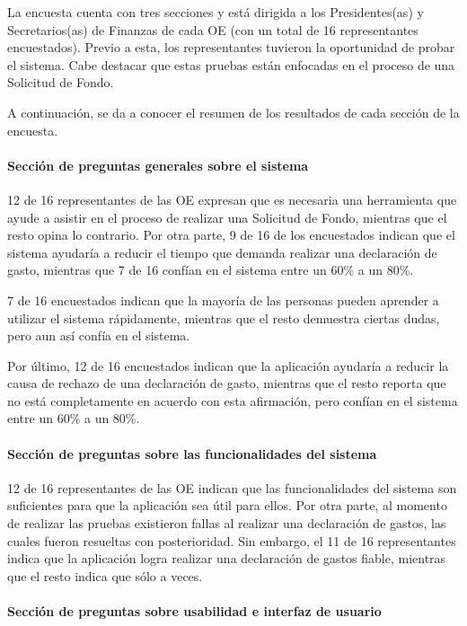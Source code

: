 La encuesta cuenta con tres secciones y está dirigida a los Presidentes(as) y Secretarios(as) de Finanzas de cada OE (con un total de 16 representantes encuestados). Previo a esta, los representantes tuvieron la oportunidad de probar el sistema. Cabe destacar que estas pruebas están enfocadas en el proceso de una Solicitud de Fondo.

A continuación, se da a conocer el resumen de los resultados de cada sección de la encuesta.

\paragraph{Sección de preguntas generales sobre el sistema}

12 de 16 representantes de las OE expresan que es necesaria una herramienta que ayude a asistir en el proceso de realizar una Solicitud de Fondo, mientras que el resto opina lo contrario. Por otra parte, 9 de 16 de los encuestados indican que el sistema ayudaría a reducir el tiempo que demanda realizar una declaración de gasto, mientras que 7 de 16 confían en el sistema entre un 60\% a un 80\%.

7 de 16 encuestados indican que la mayoría de las personas pueden aprender a utilizar el sistema rápidamente, mientras que el resto demuestra ciertas dudas, pero aun así confía en el sistema.

Por último, 12 de 16 encuestados indican que la aplicación ayudaría a reducir la causa de rechazo de una declaración de gasto, mientras que el resto reporta que no está completamente en acuerdo con esta afirmación, pero confían en el sistema entre un 60\% a un 80\%.

\paragraph{Sección de preguntas sobre las funcionalidades del sistema}

12 de 16 representantes de las OE indican que las funcionalidades del sistema son suficientes para que la aplicación sea útil para ellos. Por otra parte, al momento de realizar las pruebas existieron fallas al realizar una declaración de gastos, las cuales fueron resueltas con posterioridad. Sin embargo, el 11 de 16 representantes indica que la aplicación logra realizar una declaración de gastos fiable, mientras que el resto indica que sólo a veces.

\paragraph{Sección de preguntas sobre usabilidad e interfaz de usuario}


